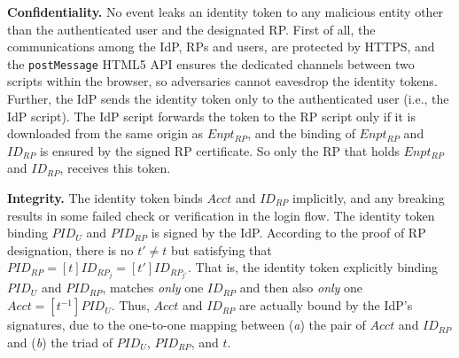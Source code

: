 %

\vspace{0.5mm}
\noindent\textbf{Confidentiality.}
No event leaks an identity token to any malicious entity other than the authenticated user and the designated RP.
First of all, the communications among the IdP, RPs and users,
    are protected by HTTPS,
    and the \verb+postMessage+ HTML5 API ensures the dedicated channels between two scripts within the browser,
    so adversaries cannot eavesdrop the identity tokens.
Further, the IdP sends the identity token only to the authenticated user
        (i.e., the IdP script).
The IdP script forwards the token to the RP script
 only if it is downloaded from the same origin as $Enpt_{RP}$,
and the binding of $Enpt_{RP}$ and $ID_{RP}$ is ensured by the signed RP certificate.
So only the RP that holds $Enpt_{RP}$ and $ID_{RP}$,
    receives this token.


\vspace{0.5mm}
\noindent\textbf{Integrity.}
The identity token binds $Acct$ and $ID_{RP}$ implicitly,
    and any breaking results in some failed check or verification in the login flow.
The identity token binding $PID_U$ and $PID_{RP}$ is signed by the IdP.
According to the proof of RP designation,
    there is no $t' \neq t$ but satisfying that $PID_{RP} = [t]ID_{RP_j} = [t']ID_{RP_{j'}}$.
That is, the identity token explicitly binding $PID_U$ and $PID_{RP}$,
    matches \emph{only} one $ID_{RP}$ and then also \emph{only} one $Acct = [t^{-1}]PID_{U}$.
Thus,
    $Acct$ and $ID_{RP}$ are actually bound by the IdP's signatures,
        due to the one-to-one mapping between (\emph{a}) the pair of $Acct$ and $ID_{RP}$ and (\emph{b}) the triad of $PID_U$, $PID_{RP}$, and $t$.

